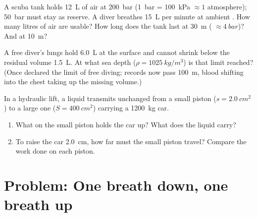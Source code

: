 \begin{exercise}[$\star\star\star$]\label{exo:g10:pressure:13}
A scuba tank holds \qty{12}{L} of air at \qty{200}{bar}
(\qty{1}{bar} = \qty{100}{kPa} $\approx 1$ atmosphere); \qty{50}{bar}
must stay as reserve. A diver breathes \qty{15}{L} per minute at
ambient . How many litres of  air are usable?
How long does the tank last at \qty{30}{m} (
$\approx \qty{4}{bar}$)? And at \qty{10}{m}?
\end{exercise}

\begin{exercise}[$\star\star\star$]\label{exo:g10:pressure:14}
A free diver's lungs hold \qty{6.0}{L} at the surface and cannot
shrink below the residual volume \qty{1.5}{L}. At what sea depth
($\rho = \qty{1025}{kg/m^3}$) is that limit reached? (Once declared
the limit of free diving; records now pass \qty{100}{m}, blood
shifting into the chest taking up the missing volume.)
\end{exercise}

\begin{exercise}[$\star\star\star$]\label{exo:g10:pressure:15}
In a hydraulic lift, a liquid transmits  unchanged from a
small piston ($s = \qty{2.0}{cm^2}$) to a large one
($S = \qty{400}{cm^2}$) carrying a \qty{1200}{kg} car.
\begin{enumerate}
  \item What  on the small piston holds the car up? What 
        does the liquid carry?
  \item To raise the car \qty{2.0}{cm}, how far must the small piston
        travel? Compare the work done on each piston.
\end{enumerate}
\end{exercise}

\section{Problem: One breath down, one breath up}

